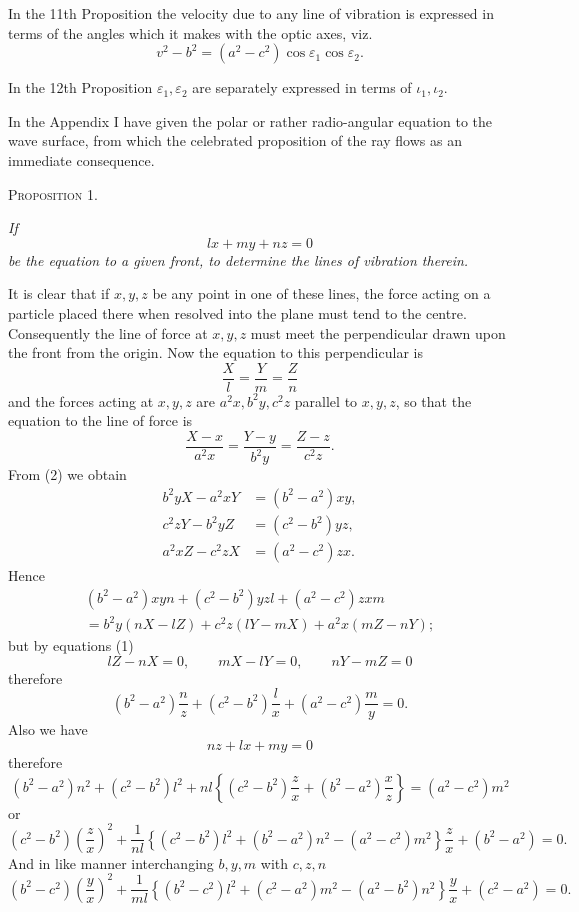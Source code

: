 \documentclass[11pt]{article}
\newcommand{\proposition}[1]{\vspace{0.9em}\begin{center}{\scshape Proposition #1.}\end{center}\vspace{0.2em}}
\newcommand{\sourcepage}[1]{\marginpar{\scriptsize p.~#1}}
\newcommand{\tagtext}[1]{\tag{#1}}
\begin{document}
In the 11th Proposition the velocity due to any line of vibration is expressed in terms of the angles which it makes with the optic axes, viz.
\[
 v^2-b^2=(a^2-c^2)\cos\varepsilon_1\cos\varepsilon_2.
\]

In the 12th Proposition $\varepsilon_1,\varepsilon_2$ are separately expressed in terms of $\iota_1,\iota_2$.

In the Appendix I have given the polar or rather radio-angular equation to the wave surface, from which the celebrated proposition of the ray flows as an immediate consequence.

\sourcepage{3}
\proposition{1}

\emph{If}
\begin{equation}
 lx+my+nz=0 \tagtext{$a$}
\end{equation}
\emph{be the equation to a given front, to determine the lines of vibration therein.}

It is clear that if $x,y,z$ be any point in one of these lines, the force acting on a particle placed there when resolved into the plane must tend to the centre. Consequently the line of force at $x,y,z$ must meet the perpendicular drawn upon the front from the origin. Now the equation to this perpendicular is
\begin{equation}
 \frac{X}{l}=\frac{Y}{m}=\frac{Z}{n} \tag{1}
\end{equation}
and the forces acting at $x,y,z$ are $a^2x,b^2y,c^2z$ parallel to $x,y,z$, so that the equation to the line of force is
\begin{equation}
 \frac{X-x}{a^2x}=\frac{Y-y}{b^2y}=\frac{Z-z}{c^2z}. \tag{2}
\end{equation}
From (2) we obtain
\begin{align}
 b^2yX-a^2xY&=(b^2-a^2)xy, \tag{3}\\
 c^2zY-b^2yZ&=(c^2-b^2)yz, \tag{4}\\
 a^2xZ-c^2zX&=(a^2-c^2)zx. \tag{5}
\end{align}
Hence
\begin{multline*}
(b^2-a^2)xyn+(c^2-b^2)yzl+(a^2-c^2)zxm\\
= b^2y(nX-lZ)+c^2z(lY-mX)+a^2x(mZ-nY);
\end{multline*}
but by equations (1)
\[
 lZ-nX=0,\qquad mX-lY=0,\qquad nY-mZ=0
\]
therefore
\begin{equation}
 (b^2-a^2)\frac{n}{z}+(c^2-b^2)\frac{l}{x}+(a^2-c^2)\frac{m}{y}=0. \tagtext{$b$}
\end{equation}
Also we have
\begin{equation}
 nz+lx+my=0 \tagtext{$a$}
\end{equation}
therefore
\[
(b^2-a^2)n^2+(c^2-b^2)l^2+nl\left\{(c^2-b^2)\frac{z}{x}+(b^2-a^2)\frac{x}{z}\right\}=(a^2-c^2)m^2
\]
or
\[
(c^2-b^2)\left(\frac{z}{x}\right)^2
+\frac{1}{nl}\left\{(c^2-b^2)l^2+(b^2-a^2)n^2-(a^2-c^2)m^2\right\}\frac{z}{x}
+(b^2-a^2)=0.
\]
And in like manner interchanging $b,y,m$ with $c,z,n$
\[
(b^2-c^2)\left(\frac{y}{x}\right)^2
+\frac{1}{ml}\left\{(b^2-c^2)l^2+(c^2-a^2)m^2-(a^2-b^2)n^2\right\}\frac{y}{x}
+(c^2-a^2)=0.
\]
\end{document}
